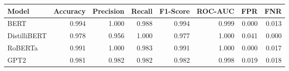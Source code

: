 \begin{tabular}{|l||r|r|r|r|r|r|r|}
\toprule
Model & \textbf{Accuracy} & \textbf{Precision} & Recall & \textbf{F1-Score} & \textbf{ROC-AUC} & \textbf{FPR} & FNR \\
\midrule \midrule
BERT & 0.994 & 1.000 & 0.988 & 0.994 & 0.999 & 0.000 & 0.013 \\
DistilliBERT & 0.978 & 0.956 & 1.000 & 0.977 & 1.000 & 0.041 & 0.000 \\
RoBERTa & 0.991 & 1.000 & 0.983 & 0.991 & 1.000 & 0.000 & 0.017 \\
GPT2 & 0.981 & 0.982 & 0.982 & 0.982 & 0.998 & 0.019 & 0.018 \\
\bottomrule
\end{tabular}
